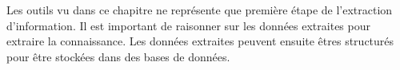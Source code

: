 


Les outils vu dans ce chapitre ne représente que première étape de l'extraction d'information.
Il est important de raisonner sur les données extraites pour extraire la connaissance.
Les données extraites peuvent ensuite êtres structurés pour être stockées dans des bases de données.
